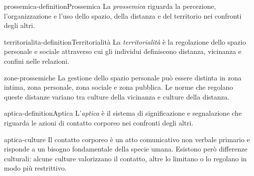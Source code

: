 \documentclass[preview]{standalone}
\begin{document}
\begin{snippetdefinition}{prossemica-definition}{Prossemica}
    La \emph{prossemica} riguarda la percezione, l'organizzazione e l'uso dello
    spazio, della distanza e del territorio nei confronti degli altri.
\end{snippetdefinition}

\begin{snippetdefinition}{territorialita-definition}{Territorialità}
    La \emph{territorialità} è la regolazione dello spazio personale e sociale
    attraverso cui gli individui definiscono distanza, vicinanza e confini nelle
    relazioni.
\end{snippetdefinition}

\begin{snippet}{zone-prossemiche}
    La gestione dello spazio personale può essere distinta in zona intima, zona
    personale, zona sociale e zona pubblica. Le norme che regolano queste
    distanze variano tra culture della vicinanza e culture della distanza.
\end{snippet}

\begin{snippetdefinition}{aptica-definition}{Aptica}
    L'\emph{aptica} è il sistema di significazione e segnalazione che riguarda
    le azioni di contatto corporeo nei confronti degli altri.
\end{snippetdefinition}

\begin{snippet}{aptica-culture}
    Il contatto corporeo è un atto comunicativo non verbale primario e risponde
    a un bisogno fondamentale della specie umana. Esistono però differenze
    culturali: alcune culture valorizzano il contatto, altre lo limitano o lo
    regolano in modo più restrittivo.
\end{snippet}
\end{document}
